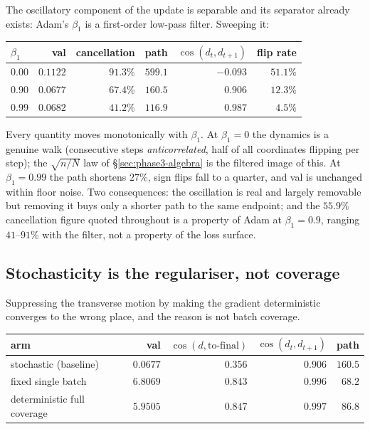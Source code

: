 The oscillatory component of the update is separable and its separator already
exists: Adam's $\beta_1$ is a first-order low-pass filter. Sweeping it:

\begin{center}
\begin{tabular}{lrrrrr}
\toprule
$\beta_1$ & val & cancellation & path & $\cos(d_t,d_{t+1})$ & flip rate \\
\midrule
$0.00$ & $0.1122$ & $91.3\%$ & $599.1$ & $-0.093$ & $51.1\%$ \\
$0.90$ & $0.0677$ & $67.4\%$ & $160.5$ & $\phantom{-}0.906$ & $12.3\%$ \\
$0.99$ & $0.0682$ & $41.2\%$ & $116.9$ & $\phantom{-}0.987$ & $\phantom{0}4.5\%$ \\
\bottomrule
\end{tabular}
\end{center}

Every quantity moves monotonically with $\beta_1$. At $\beta_1=0$ the dynamics
is a genuine walk (consecutive steps \emph{anticorrelated}, half of all
coordinates flipping per step); the $\sqrt{n/N}$ law of
\S\ref{sec:phase3-algebra} is the filtered image of this. At $\beta_1=0.99$ the
path shortens $27\%$, sign flips fall to a quarter, and val is unchanged within
floor noise. Two consequences: the oscillation is real and largely removable
but removing it buys only a shorter path to the same endpoint; and the
$55.9\%$ cancellation figure quoted throughout is a property of Adam at
$\beta_1=0.9$, ranging $41$--$91\%$ with the filter, not a property of the loss
surface.

\subsection{Stochasticity is the regulariser, not coverage}
\label{sec:deterministic}

Suppressing the transverse motion by making the gradient deterministic
converges to the wrong place, and the reason is not batch coverage.

\begin{center}
\begin{tabular}{lrrrr}
\toprule
arm & val & $\cos(d,\text{to-final})$ & $\cos(d_t,d_{t+1})$ & path \\
\midrule
stochastic (baseline) & $0.0677$ & $0.356$ & $0.906$ & $160.5$ \\
fixed single batch    & $6.8069$ & $0.843$ & $0.996$ & $\phantom{0}68.2$ \\
deterministic full coverage & $5.9505$ & $0.847$ & $0.997$ & $\phantom{0}86.8$ \\
\bottomrule
\end{tabular}
\end{center}


